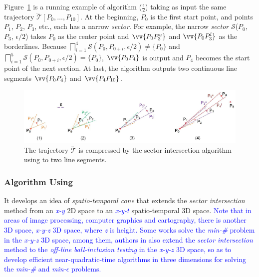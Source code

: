 \begin{example}
	\label{exm-alg-sleeve}
	Figure~\ref{fig:sleeve} is a running example of algorithm \siped($\frac{\epsilon}{2}$) taking as input the same trajectory $\dddot{\mathcal{T}}[P_0, \ldots, P_{10}]$. At the beginning, $P_0$ is the first start point, and points $P_1$, $P_2$, $P_3$, etc., each has a narrow \emph{sector}.
	For example, the narrow \emph{sector} $\mathcal{S}$($P_0$, $P_{3}$, $\epsilon/2$) takes $P_0$ as the center point and $\vv{P_0P^u_{3}}$ and $\vv{P_0P^l_{3}}$ as the borderlines.
	Because $\bigsqcap_{i=1}^{4}\mathcal{S}(P_0, P_{0+i}, \epsilon/2) \ne \{P_0\}$ and $\bigsqcap_{i=1}^{5}\mathcal{S}(P_0, P_{0+i}, \epsilon/2) = \{P_0\}$, $\vv{P_0P_4}$ is output and $P_4$ becomes the start point of the next section.
	At last, the algorithm outputs two continuous line segments $\vv{P_0P_4}$ and $\vv{P_4P_{10}}$.
\end{example}

\begin{figure}[tb!]
	\centering
	\includegraphics[scale=0.66]{Figures/Fig-sleeve.jpg}
	\vspace{-2ex}
	\caption{\small The trajectory $\dddot{\mathcal{T}}$ is compressed by the sector intersection algorithm using \ped to two line segments.}
	\vspace{-1ex}
	\label{fig:sleeve}
\end{figure}




\subsubsection{Algorithm \cised Using \sed \cite{Lin:Cised}}
It develops an idea of \textit{spatio-temporal cone} that extends the \textit{sector intersection} method \cite{Williams:Longest, Sklansky:Cone, Dunham:Cone, Zhao:Sleeve} from an \textcolor{blue}{\em x-y} 2D space to an \textcolor{blue}{\em x-y-t} spatio-temporal 3D space.
\textcolor{blue}{Note that in areas of image processing, computer graphics and cartography, there is another 3D space, \ie \emph{x-y-z} 3D space, where {\em z} is height. Some works \cite{Barequet:3D, Eu:Ln3D} solve the \emph{min-\#} problem in the \emph{x-y-z} 3D space, among them, authors in \cite{Barequet:3D} also extend the \textit{sector intersection} method to the \textit{off-line ball-inclusion testing} in the \emph{x-y-z} 3D space, so as to develop efficient near-quadratic-time algorithms in three dimensions for solving the \emph{min-\#} and \emph{min-$\epsilon$} problems.} %

